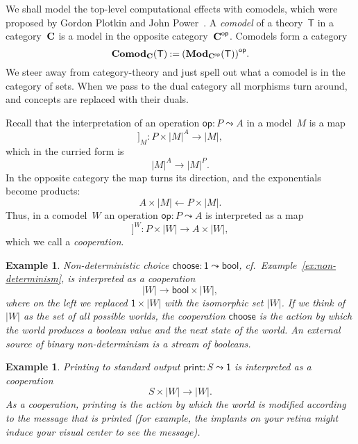\documentclass{amsart}
\newcommand{\theory}[1]{\mathsf{#1}} %
\newcommand{\ModC}[2]{\text{\textbf{Mod}}_{#1}(\theory{#2})} %
\newcommand{\ComodC}[2]{\text{\textbf{Comod}}_{#1}(\theory{#2})} %
\newcommand{\category}[1]{\text{\textbf{#1}}} %
\newcommand{\opcat}[1]{{#1}^{\mathsf{op}}} %
\newcommand{\opdecl}[3]{#1 : #2 \leadsto #3} %
\newcommand{\one}{\mathsf{1}} %
\newcommand{\sem}[1]{[\![#1]\!]} %
\newcommand{\bool}{\mathsf{bool}} %
\newcommand{\defeq}{\mathbin{{:}{=}}} %
\newcommand{\kode}[1]{\mathsf{#1}}
\newtheorem{example}[definition]{Example}
\begin{document}
We shall model the top-level computational effects with comodels, which were
proposed by Gordon Plotkin and John
Power~\cite{plotkin08:_tensor_comod_model_operat_seman}. A \emph{comodel} of a
theory~$\theory{T}$ in a category~$\category{C}$ is a model in the opposite
category~$\opcat{\category{C}}$. Comodels form a category
%
\begin{equation*}
  \ComodC{\category{C}}{T} \defeq \opcat{(\ModC{\opcat{\category{C}}}{T})}.
\end{equation*}
%
We steer away from category-theory and just spell out what a comodel is in the
category of sets. When we pass to the dual category all morphisms turn around,
and concepts are replaced with their duals.

Recall that the interpretation of an operation $\opdecl{\kode{op}}{P}{A}$ in a
model~$M$ is a map
%
\begin{equation*}
  \sem{\kode{op}}_M :
  P \times |M|^A \longrightarrow |M|,
\end{equation*}
%
which in the curried form is
%
\begin{equation*}
  |M|^A \longrightarrow |M|^P.
\end{equation*}
%
In the opposite category the map turns its direction, and the exponentials
become products:
%
\begin{equation*}
  A \times |M| \longleftarrow P \times |M|.
\end{equation*}
%
Thus, in a comodel~$W$ an operation $\opdecl{\kode{op}}{P}{A}$ is interpreted as a map
%
\begin{equation*}
  \sem{\kode{op}}^W : P \times |W| \to A \times |W|,
\end{equation*}
%
which we call a \emph{cooperation}.

\begin{example}
  Non-deterministic choice $\opdecl{\kode{choose}}{\one}{\bool}$, cf.\
  Example~\ref{ex:non-determinism}, is interpreted as a cooperation
  \begin{equation*}
    |W| \to {\bool} \times |W|,
  \end{equation*}
  where on the left we replaced $\one \times |W|$ with the isomorphic set $|W|$.
  If we think of $|W|$ as the set of all possible worlds, the cooperation
  $\kode{choose}$ is the action by which the world produces a boolean value and
  the next state of the world. An external source of binary non-determinism is a
  stream of booleans.
\end{example}

\begin{example}
  Printing to standard output $\opdecl{\kode{print}}{S}{\one}$ is interpreted as
  a cooperation
  \begin{equation*}
    S \times |W| \to |W|.
  \end{equation*}
  As a cooperation, printing is the action by which the world is modified
  according to the message that is printed (for example, the implants on your
  retina might induce your visual center to see the message).
\end{example}
\end{document}
